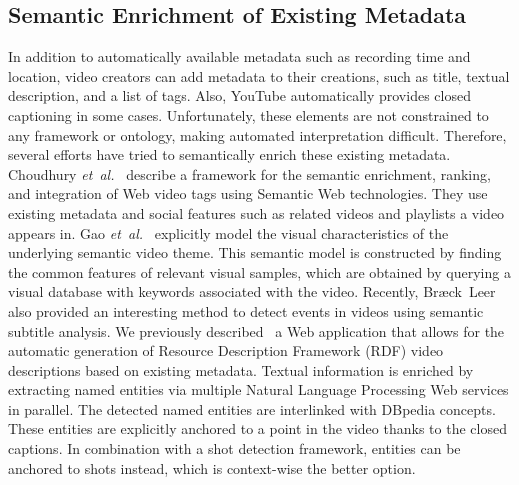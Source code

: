 \documentclass[runningheads,a4paper]{llncs}
\begin{document}
\subsection{Semantic Enrichment of Existing Metadata}
In addition to automatically available metadata such as recording time and location, video creators can add metadata to their creations, such as title, textual description, and a list of tags. Also, YouTube automatically provides closed captioning in some cases. Unfortunately, these elements are not constrained to any framework or ontology, making automated interpretation difficult. Therefore, several efforts have tried to semantically enrich these existing metadata. Choudhury \emph{et~al.}~\cite{Choudhury:YouTube} describe a framework for the semantic enrichment, ranking, and integration of Web video tags using Semantic Web technologies. They use existing metadata and social features such as related videos and playlists a video appears in. Gao \emph{et~al.}~\cite{Gao:2009} explicitly model the visual characteristics of the underlying semantic video theme. This semantic model is constructed by finding the common features of relevant visual samples, which are obtained by querying a visual database with keywords associated with the video. Recently, Br{\ae}ck~Leer~\cite{BraeckLeer:2011} also provided an interesting method to detect events in videos using semantic subtitle analysis. We previously described~\cite{semwebvid} a Web application that allows for the automatic generation of Resource Description Framework (RDF) video descriptions based on existing metadata. Textual information is enriched by extracting named entities via multiple Natural Language Processing Web services in parallel. The detected named entities are interlinked with DBpedia concepts. These entities are explicitly anchored to a point in the video thanks to the closed captions. In combination with a shot detection framework, entities can be anchored to shots instead, which is context-wise the better option.
\end{document}
